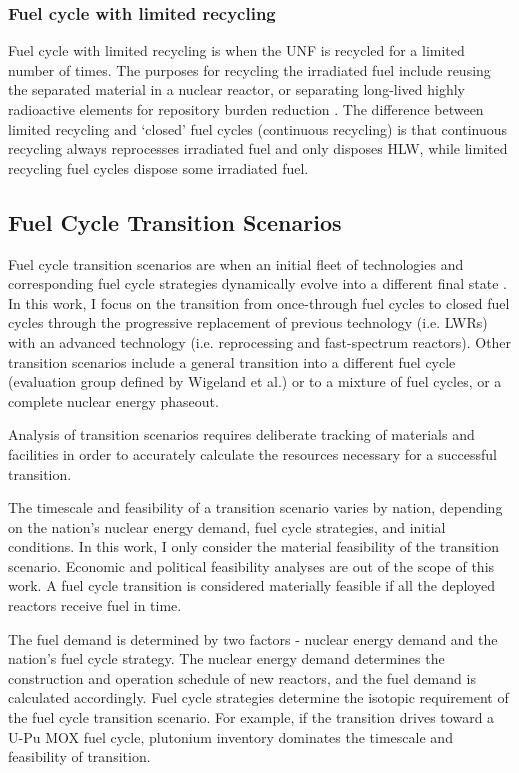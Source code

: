\subsubsection{Fuel cycle with limited recycling}
Fuel cycle with limited recycling is when the \gls{UNF}
is recycled for a limited number of times. 
The purposes for recycling the irradiated fuel include
reusing the separated material in a nuclear reactor, or 
separating long-lived highly radioactive elements
for repository burden reduction \cite{wigeland_nuclear_2014}.
The difference
between limited recycling and `closed' fuel cycles (continuous
recycling) is that continuous recycling always reprocesses
irradiated fuel and only disposes \gls{HLW}, while limited
recycling fuel cycles dispose some irradiated fuel.


\subsection{Fuel Cycle Transition Scenarios}
Fuel cycle transition scenarios are when an initial
fleet of technologies and corresponding fuel cycle strategies
dynamically evolve into a different final state \cite{oecd_nuclear_2009}.
In this work, I focus on the transition from
once-through fuel cycles to closed fuel
cycles through the progressive replacement of previous technology
(i.e. \glspl{LWR}) with an advanced technology (i.e. reprocessing
and fast-spectrum reactors). Other transition scenarios include
a general transition into a different fuel cycle (evaluation group
defined by Wigeland et al.) or to a mixture of fuel cycles, or
a complete nuclear energy phaseout.

Analysis of transition scenarios requires
deliberate tracking of materials and facilities in order
to accurately calculate the resources necessary for a
successful transition.

The timescale and feasibility of a transition scenario
varies by nation, depending on the nation's nuclear energy demand,
fuel cycle strategies, and initial conditions.
In this work, I only consider the material feasibility of the
transition scenario. Economic and political feasibility analyses
are out of the scope of this work. A fuel cycle transition is considered
materially feasible if all the deployed reactors receive fuel
in time.

The fuel demand is determined by two factors - nuclear energy demand
and the nation's fuel cycle strategy.
The nuclear energy demand determines the construction
and operation
schedule of new reactors, and the fuel demand is
calculated accordingly.
Fuel cycle strategies determine the isotopic
requirement of the fuel cycle transition scenario. For example,
if the transition drives toward a U-Pu \gls{MOX} fuel cycle,
plutonium inventory dominates the timescale and feasibility of transition.

